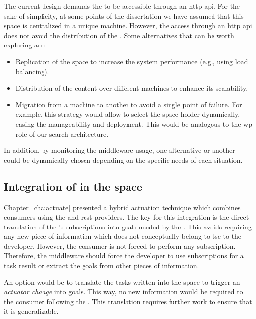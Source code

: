 The current design demands the \coordspace{} to be accessible through an \ac{http} \ac{api}.
For the sake of simplicity, at some points of the dissertation we have assumed that this space is centralized in a unique machine.
However, the access through an \ac{http} \ac{api} does not avoid the distribution of the \coordspace{}.
Some alternatives that can be worth exploring are: %
\begin{itemize}
  \item Replication of the space to increase the system performance (e.g., using load balancing).
  \item Distribution of the content over different machines to enhance its scalability. %
  \item Migration from a machine to another to avoid a single point of failure.
        For example, this strategy would allow to select the space holder dynamically, easing the \coordspace{} manageability and deployment.
        This would be analogous to the \ac{wp} role of our search architecture. %
\end{itemize}

In addition, by monitoring the middleware usage, one alternative or another could be dynamically chosen depending on the specific needs of each situation.


\subsection{Integration of \restActuation{} in the space}

Chapter~\ref{cha:actuate} presented a hybrid actuation technique which combines consumers using the \spaceActuation{} and \ac{rest} providers.
The key for this integration is the direct translation of the \coordspace{}'s subscriptions into goals needed by the \restActuation{}.
This avoids requiring any new piece of information which does not conceptually belong to \ac{tsc} to the developer.
However, the consumer is not forced to perform any subscription.
Therefore, the middleware should force the developer to use subscriptions for a task result or extract the goals from other pieces of information.


An option would be to translate the tasks written into the space to trigger an \emph{actuator change} into goals.
This way, no new information would be required to the consumer following the \spaceActuation{}.
This translation requires further work to ensure that it is generalizable.

